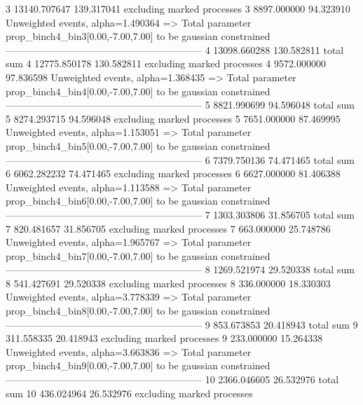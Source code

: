 3          13140.707647    139.317041      excluding marked processes    
3          8897.000000     94.323910       Unweighted events, alpha=1.490364
  => Total parameter prop_binch4_bin3[0.00,-7.00,7.00] to be gaussian constrained
------------------------------------------------------------
4          13098.660288    130.582811      total sum                     
4          12775.850178    130.582811      excluding marked processes    
4          9572.000000     97.836598       Unweighted events, alpha=1.368435
  => Total parameter prop_binch4_bin4[0.00,-7.00,7.00] to be gaussian constrained
------------------------------------------------------------
5          8821.990699     94.596048       total sum                     
5          8274.293715     94.596048       excluding marked processes    
5          7651.000000     87.469995       Unweighted events, alpha=1.153051
  => Total parameter prop_binch4_bin5[0.00,-7.00,7.00] to be gaussian constrained
------------------------------------------------------------
6          7379.750136     74.471465       total sum                     
6          6062.282232     74.471465       excluding marked processes    
6          6627.000000     81.406388       Unweighted events, alpha=1.113588
  => Total parameter prop_binch4_bin6[0.00,-7.00,7.00] to be gaussian constrained
------------------------------------------------------------
7          1303.303806     31.856705       total sum                     
7          820.481657      31.856705       excluding marked processes    
7          663.000000      25.748786       Unweighted events, alpha=1.965767
  => Total parameter prop_binch4_bin7[0.00,-7.00,7.00] to be gaussian constrained
------------------------------------------------------------
8          1269.521974     29.520338       total sum                     
8          541.427691      29.520338       excluding marked processes    
8          336.000000      18.330303       Unweighted events, alpha=3.778339
  => Total parameter prop_binch4_bin8[0.00,-7.00,7.00] to be gaussian constrained
------------------------------------------------------------
9          853.673853      20.418943       total sum                     
9          311.558335      20.418943       excluding marked processes    
9          233.000000      15.264338       Unweighted events, alpha=3.663836
  => Total parameter prop_binch4_bin9[0.00,-7.00,7.00] to be gaussian constrained
------------------------------------------------------------
10         2366.046605     26.532976       total sum                     
10         436.024964      26.532976       excluding marked processes    
